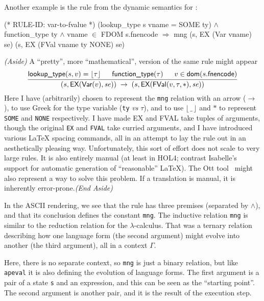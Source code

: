 \documentclass[11pt]{article}
\begin{document}
Another example is the rule  from the dynamic
semantics for \cpp{}:
\begin{stdrule}
(* RULE-ID: var-to-fvalue *)
     (lookup_type s vname = SOME ty) \(\land\)
     function_type ty \(\land\)
     vname \(\in\) FDOM s.fnencode
   \(\Rightarrow\)
     mng (s, EX (Var vname) se) (s, EX (FVal vname ty NONE) se)
\end{stdrule}
\textit{(Aside)} A ``pretty'', more ``mathematical'', version of the same rule might
appear
\[
\infer{(s,\textsf{EX}(\textsf{Var}(v),\mathit{se})) \;\rightarrow\;
       (s,\textsf{EX}(\textsf{FVal}(v,\tau,*),\mathit{se}))}{
       \textsf{lookup\_type}(s,v) = \lfloor\tau\rfloor \;&\;
       \textsf{function\_type}(\tau) \;&\;
       v \in \textsf{dom}(s.\textsf{fnencode})}
\]
Here I have (arbitrarily) chosen to represent the \texttt{mng}
relation with an arrow ($\rightarrow$), to use Greek for the type
variable (\texttt{ty} \textit{vs} $\tau$), and to use
$\lfloor\,\_\,\rfloor$ and $*$ to represent \texttt{SOME} and
\texttt{NONE} respectively.  I have made \textsf{EX} and \textsf{FVAL}
take tuples of arguments, though the original \texttt{EX} and
\texttt{FVAL} take curried arguments, and I have introduced various
\LaTeX{} spacing commands, all in an attempt to lay the rule out in an
aesthetically pleasing way.  Unfortunately, this sort of effort does
not scale to very large rules. It is also entirely manual (at least in
HOL4; contrast Isabelle's support for automatic generation of
``reasonable'' \LaTeX).  The Ott tool~\cite{Sewell:OTT2007} might also
represent a way to solve this problem. If a translation is manual, it
is inherently error-prone.\hfill{\textit{(End Aside)}}

In the ASCII rendering, we see that the rule has three premises
(separated by $\land$), and that its conclusion defines the constant
\texttt{mng}.  The inductive relation \texttt{mng} is similar to the
reduction relation for the $\lambda$-calculus. That was a ternary
relation describing how one language form (the second argument) might
evolve into another (the third argument), all in a context $\Gamma$.

Here, there is no separate context, so \texttt{mng} is just a binary
relation, but like \texttt{apeval} it is also defining the evolution
of language forms.  The first argument is a pair of a state \texttt{s}
and an expression, and this can be seen as the ``starting point''.  The
second argument is another pair, and it is the result of the execution
step.
\end{document}
